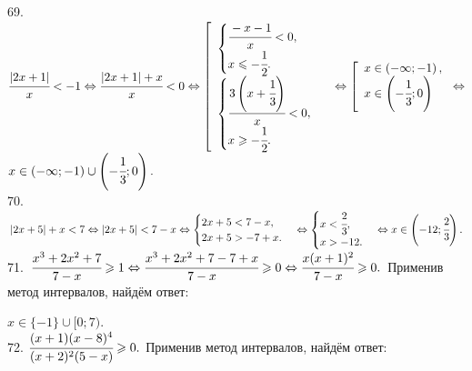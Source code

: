 \documentclass[12pt]{article}
\begin{document}
69. $\cfrac{|2x+1|}{x}<-1\Leftrightarrow\cfrac{|2x+1|+x}{x}<0\Leftrightarrow
\left[\begin{array}{l}\begin{cases}\cfrac{-x-1}{x}<0,\\ x\leqslant-\cfrac{1}{2}.\end{cases}\\ \begin{cases}\cfrac{3\left(x+\cfrac{1}{3}\right)}{x}<0,\\ x\geqslant-\cfrac{1}{2}.\end{cases}  \end{array}\right.\Leftrightarrow\left[\begin{array}{l} x\in\left(-\infty;-1\right),\\
x\in\left(-\cfrac{1}{3};0\right)\end{array}\right.\Leftrightarrow$\\$ x\in\left(-\infty;-1\right)\cup\left(-\cfrac{1}{3};0\right).$\\
70. $|2x+5|+x<7\Leftrightarrow |2x+5|<7-x\Leftrightarrow \begin{cases}2x+5<7-x,\\ 2x+5>-7+x.\end{cases}
\Leftrightarrow \begin{cases}x<\cfrac{2}{3},\\ x>-12.\end{cases}\Leftrightarrow x\in\left(-12;\cfrac{2}{3}\right).$\\
71. $\cfrac{x^3+2x^2+7}{7-x}\geqslant1\Leftrightarrow\cfrac{x^3+2x^2+7-7+x}{7-x}\geqslant0\Leftrightarrow
\cfrac{x(x+1)^2}{7-x}\geqslant0.$ Применив метод интервалов, найдём ответ:
\begin{figure}[ht!]
\end{figure}
$x\in\{-1\}\cup[0;7).$\\
72. $\cfrac{(x+1)(x-8)^4}{(x+2)^2(5-x)}\geqslant0.$ Применив метод интервалов, найдём ответ:
\begin{figure}[ht!]
\end{figure}
\end{document}
